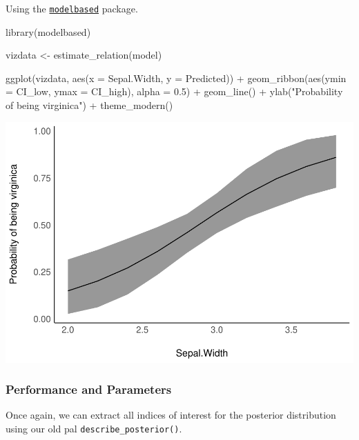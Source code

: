 \documentclass[10pt,a4paper,onecolumn]{article}
\newenvironment{Shaded}{\begin{snugshade}}{\end{snugshade}}
\newcommand{\AttributeTok}[1]{\textcolor[rgb]{0.77,0.63,0.00}{#1}}
\newcommand{\FloatTok}[1]{\textcolor[rgb]{0.00,0.00,0.81}{#1}}
\newcommand{\FunctionTok}[1]{\textcolor[rgb]{0.00,0.00,0.00}{#1}}
\newcommand{\NormalTok}[1]{#1}
\newcommand{\OtherTok}[1]{\textcolor[rgb]{0.56,0.35,0.01}{#1}}
\newcommand{\SpecialCharTok}[1]{\textcolor[rgb]{0.00,0.00,0.00}{#1}}
\newcommand{\StringTok}[1]{\textcolor[rgb]{0.31,0.60,0.02}{#1}}
\begin{document}
Using the
\href{https://github.com/easystats/modelbased}{\texttt{modelbased}}
package.

\begin{Shaded}
\begin{Highlighting}[]
\FunctionTok{library}\NormalTok{(modelbased)}

\NormalTok{vizdata }\OtherTok{\textless{}{-}} \FunctionTok{estimate\_relation}\NormalTok{(model)}

\FunctionTok{ggplot}\NormalTok{(vizdata, }\FunctionTok{aes}\NormalTok{(}\AttributeTok{x =}\NormalTok{ Sepal.Width, }\AttributeTok{y =}\NormalTok{ Predicted)) }\SpecialCharTok{+}
  \FunctionTok{geom\_ribbon}\NormalTok{(}\FunctionTok{aes}\NormalTok{(}\AttributeTok{ymin =}\NormalTok{ CI\_low, }\AttributeTok{ymax =}\NormalTok{ CI\_high), }\AttributeTok{alpha =} \FloatTok{0.5}\NormalTok{) }\SpecialCharTok{+}
  \FunctionTok{geom\_line}\NormalTok{() }\SpecialCharTok{+} 
  \FunctionTok{ylab}\NormalTok{(}\StringTok{"Probability of being virginica"}\NormalTok{) }\SpecialCharTok{+}
  \FunctionTok{theme\_modern}\NormalTok{()}
\end{Highlighting}
\end{Shaded}

\includegraphics[width=1\linewidth]{paper_files/figure-latex/unnamed-chunk-39-1}

\hypertarget{performance-and-parameters}{%
\subsubsection{Performance and
Parameters}\label{performance-and-parameters}}

Once again, we can extract all indices of interest for the posterior
distribution using our old pal \texttt{describe\_posterior()}.
\end{document}
